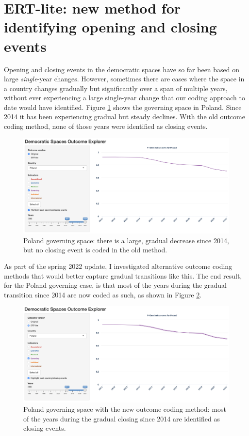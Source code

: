 \documentclass[
  11pt,
]{article}
\begin{document}
\hypertarget{ert-lite-new-method-for-identifying-opening-and-closing-events}{%
\section{ERT-lite: new method for identifying opening and closing
events}\label{ert-lite-new-method-for-identifying-opening-and-closing-events}}

Opening and closing events in the democratic spaces have so far been
based on large \emph{single}-year changes. However, sometimes there are
cases where the space in a country changes gradually but significantly
over a span of multiple years, without ever experiencing a large
single-year change that our coding approach to date would have
identified. Figure \ref{fig:poland-old} shows the governing space in
Poland. Since 2014 it has been experiencing gradual but steady declines.
With the old outcome coding method, none of those years were identified
as closing events.

\begin{figure}
\centering
\caption{Poland governing space: there is a large, gradual decrease since 2014, but no closing event is coded in the old method.\label{fig:poland-old}}
\includegraphics{report-figures/poland-governing.png}
\end{figure}

As part of the spring 2022 update, I investigated alternative outcome
coding methods that would better capture gradual transitions like this.
The end result, for the Poland governing case, is that most of the years
during the gradual transition since 2014 are now coded as such, as shown
in Figure \ref{fig:poland-new}.

\begin{figure}
\centering
\caption{Poland governing space with the new outcome coding method: most of the years during the gradual closing since 2014 are identified as closing events.\label{fig:poland-new}}
\includegraphics{report-figures/poland-governing-new.png}
\end{figure}
\end{document}
